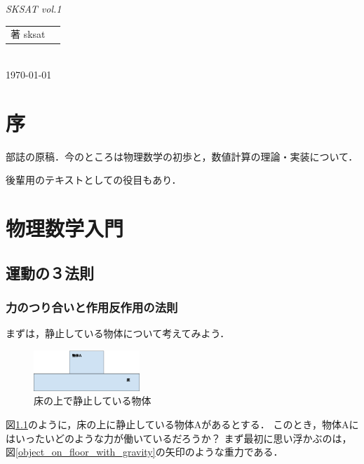 \documentclass[b5paper]{ujreport}
\begin{document}
\begin{titlepage}
\begin{center}
\vspace*{3pt}
{\large\itshape SKSAT vol.1}
\vspace{12pt} \\
\begin{tabular}{rl}
著 sksat
\end{tabular}
\vspace{3pt} \\
\today \vspace{12pt} \\
\end{center}
\end{titlepage}

\chapter*{序}
部誌の原稿．今のところは物理数学の初歩と，数値計算の理論・実装について．

後輩用のテキストとしての役目もあり．

\chapter{物理数学入門}
\section{運動の３法則}
\subsection{力のつり合いと作用反作用の法則}

まずは，静止している物体について考えてみよう．

\begin{figure}[htbp]
\begin{center}
\includegraphics[width=4cm]{img/床の上で静止している物体.eps}
\end{center}
\caption{床の上で静止している物体}
\label{object_on_floor}
\end{figure}

図\ref{object_on_floor}のように，床の上に静止している物体Aがあるとする．
このとき，物体Aにはいったいどのような力が働いているだろうか？
まず最初に思い浮かぶのは，図\ref{object_on_floor_with_gravity}の矢印のような重力である．
\end{document}
